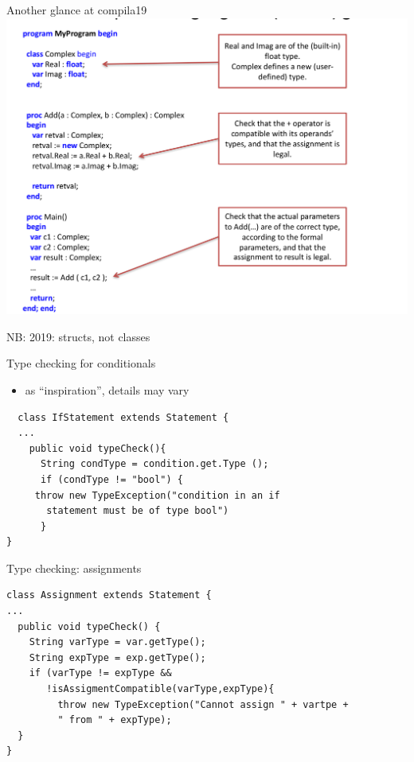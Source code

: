 \documentclass{beamer}
\begin{document}
\begin{frame}[label={sec:org3810fb8}]{Another glance at compila19}
\includegraphics[width=\textwidth]{figures/snaps/compilaexample-checking}


NB: 2019: structs, not classes 
\end{frame}


\begin{frame}[label={sec:orgcb01965},fragile,plain]{Type checking for conditionals}
 \begin{itemize}
\item as ``inspiration'', details may vary
\end{itemize}


\lstset{language=java,label= ,caption= ,captionpos=b,numbers=none}
\begin{lstlisting}
  class IfStatement extends Statement {
  ...
    public void typeCheck(){
      String condType = condition.get.Type ();
      if (condType != "bool") {  
	 throw new TypeException("condition in an if 
	   statement must be of type bool")
      }
}
\end{lstlisting}
\end{frame}


\begin{frame}[label={sec:org55554f4},fragile,plain]{Type checking: assignments}
 \lstset{language=java,label= ,caption= ,captionpos=b,numbers=none}
\begin{lstlisting}
class Assignment extends Statement {
...
  public void typeCheck() {
    String varType = var.getType();
    String expType = exp.getType();
    if (varType != expType &&
       !isAssigmentCompatible(varType,expType){
		 throw new TypeException("Cannot assign " + vartpe + 
		 " from " + expType);
  }
}

\end{lstlisting}
\end{frame}
\end{document}
